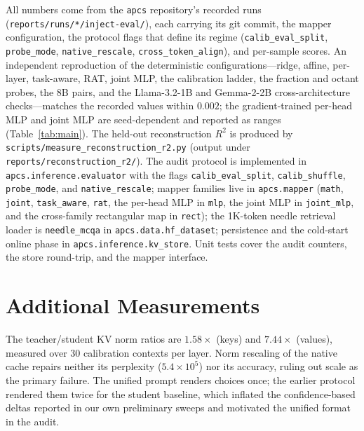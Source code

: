 \documentclass[10pt]{article}
\begin{document}
All numbers come from the \texttt{apcs} repository's recorded runs
(\texttt{reports/runs/*/inject-eval/}), each carrying its git commit, the
mapper configuration, the protocol flags that define its regime
(\texttt{calib\_eval\_\allowbreak split}, \texttt{probe\_mode},
\texttt{native\_\allowbreak rescale},
\texttt{cross\_\allowbreak token\_\allowbreak align}), and per-sample scores. An independent
reproduction of the deterministic configurations---ridge, affine, per-layer,
task-aware, RAT, joint MLP, the calibration ladder, the fraction and octant
probes, the 8B pairs, and the Llama-3.2-1B and Gemma-2-2B cross-architecture
checks---matches the recorded values within
$0.002$; the gradient-trained per-head MLP and joint MLP are seed-dependent and
reported as ranges (Table~\ref{tab:main}). The held-out
reconstruction $R^2$ is produced by \texttt{scripts/measure\_reconstruction\_r2.py}
(output under \texttt{reports/reconstruction\_r2/}). The audit protocol
is implemented in \texttt{apcs.\allowbreak inference.\allowbreak evaluator}
with the flags
\texttt{calib\_eval\_\allowbreak split}, \texttt{calib\_shuffle},
\texttt{probe\_mode},
and \texttt{native\_\allowbreak rescale}; mapper families live in
\texttt{apcs.\allowbreak mapper}
(\texttt{math}, \texttt{joint}, \texttt{task\_\allowbreak aware}, \texttt{rat}, the
per-head MLP in \texttt{mlp}, the joint MLP in \texttt{joint\_\allowbreak mlp}, and the
cross-family rectangular map in \texttt{rect}); the
1K-token needle retrieval loader is \texttt{needle\_\allowbreak mcqa} in
\texttt{apcs.\allowbreak data.\allowbreak hf\_\allowbreak dataset};
persistence and the cold-start online phase in
\texttt{apcs.inference.kv\_store}. Unit tests cover the audit counters, the
store round-trip, and the mapper interface.

\section{Additional Measurements}
The teacher/student KV norm ratios are $1.58\times$ (keys) and $7.44\times$
(values), measured over 30 calibration contexts per layer. Norm rescaling of
the native cache repairs neither its perplexity ($5.4\times10^{5}$) nor its
accuracy, ruling out scale as the primary failure. The unified prompt
renders choices once; the earlier protocol rendered them twice for the
student baseline, which inflated the confidence-based deltas reported in our
own preliminary sweeps and motivated the unified format in the audit.
\end{document}
